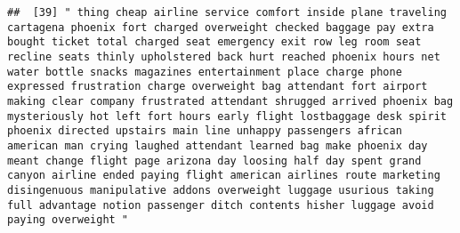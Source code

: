 \documentclass[
]{article}
\begin{document}
\begin{verbatim}
##  [39] " thing cheap airline service comfort inside plane traveling cartagena phoenix fort charged overweight checked baggage pay extra bought ticket total charged seat emergency exit row leg room seat recline seats thinly upholstered back hurt reached phoenix hours net water bottle snacks magazines entertainment place charge phone expressed frustration charge overweight bag attendant fort airport making clear company frustrated attendant shrugged arrived phoenix bag mysteriously hot left fort hours early flight lostbaggage desk spirit phoenix directed upstairs main line unhappy passengers african american man crying laughed attendant learned bag make phoenix day meant change flight page arizona day loosing half day spent grand canyon airline ended paying flight american airlines route marketing disingenuous manipulative addons overweight luggage usurious taking full advantage notion passenger ditch contents hisher luggage avoid paying overweight "                                                                                                                                                                                                                                                                                                                                                                                                                                                                                                                                                                                                                                                                                                                                                                                                     

\end{verbatim}
\end{document}
